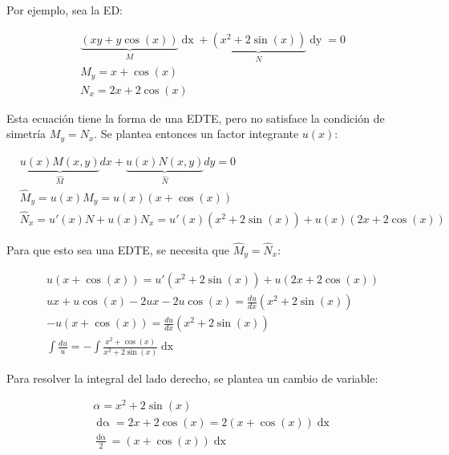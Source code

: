 \documentclass{article}
\begin{document}
Por ejemplo, sea la ED:

\begin{subequations}
\begin{align}
& \underbrace{ (xy + y \cos(x)) }_{M} \mathop{dx} + \underbrace{ (x^2 + 2 \sin(x)) }_N \mathop{dy} = 0 \\
& M_y = x + \cos(x) \\
& N_x = 2x + 2 \cos(x)
\end{align}
\end{subequations}

Esta ecuación tiene la forma de una EDTE, pero no satisface la condición de simetría $M_y = N_x$. Se plantea entonces un factor integrante $u(x)$:

\begin{subequations}
\begin{align}
& \underbrace{ u(x) M(x,y) }_{\hat{M}} dx + \underbrace{ u(x) N(x,y) }_{\hat{N}} dy = 0 \\ 
& \hat{M}_y = u(x) M_y = u(x) (x + \cos(x)) \\
& \hat{N}_x = u'(x) N + u(x) N_x = u'(x) (x^2 + 2 \sin(x)) + u(x) (2x + 2 \cos(x))  
\end{align}
\end{subequations}

Para que esto sea una EDTE, se necesita que $\hat{M}_y = \hat{N}_x$:

\begin{subequations}
\begin{align}
& u (x + \cos(x)) = u' (x^2 + 2 \sin(x)) + u (2x + 2 \cos(x)) \\
& u x + u \cos(x) - 2 u x -2 u \cos(x) = \frac{du}{dx} \left( x^2 + 2 \sin(x) \right) \\
& -u (x + \cos(x)) = \frac{du}{dx} \left( x^2 + 2 \sin(x) \right) \\
& \int \frac{du}{u} = -\int \frac{x^2 + \cos(x)}{x^2 + 2 \sin(x)} \mathop{dx}
\end{align}
\end{subequations}

Para resolver la integral del lado derecho, se plantea un cambio de variable:

\begin{subequations}
\begin{align}
& \alpha = x^2 + 2 \sin(x) \\
& \mathop{d\alpha} = 2 x + 2 \cos(x) = 2 (x + \cos(x)) \mathop{dx} \\
& \frac{\mathop{d\alpha}}{2} = (x + \cos(x)) \mathop{dx}
\end{align}
\end{subequations}
\end{document}
